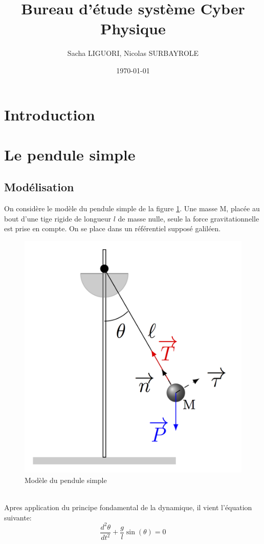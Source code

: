\documentclass[11pt]{article}
\author{Sacha LIGUORI, Nicolas SURBAYROLE}
\title{Bureau d'étude système Cyber Physique}
\date{\today}
\begin{document}
\maketitle

\tableofcontents

\newpage

\section*{Introduction}

\section{Le pendule simple}
\subsection{Modélisation}
On considère le modèle du pendule simple de la figure \ref{model_pendule}. Une masse M, placée au bout d'une tige rigide de longueur $l$ de masse nulle, seule la force gravitationnelle est prise en compte. On se place dans un référentiel supposé galiléen.
\begin{figure}[h]
	\includegraphics[scale=2]{images/modele_pendule}
	\caption{Modèle du pendule simple}
	\label{model_pendule}
\end{figure}\\
Apres application du principe fondamental de la dynamique, il vient l'équation suivante: 
\begin{equation}
	\frac{d^2\theta}{dt^2} + \frac{g}{l}\sin(\theta)=0
\end{equation}
\end{document}
